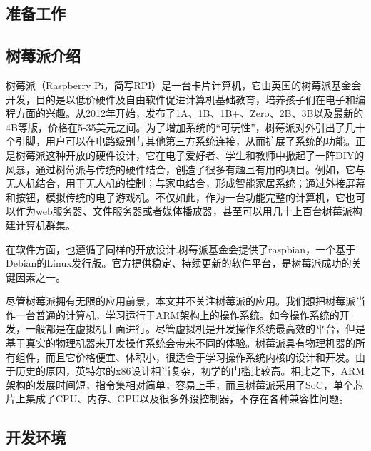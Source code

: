\documentclass[main.tex]{subfiles}
\begin{document}
\ifxetex\else
\begin{CJK*}{UTF8}{song}
\fi

\chapter{准备工作}
\section{树莓派介绍}

\par
树莓派（Raspberry Pi，简写RPI）是一台卡片计算机，它由英国的树莓派基金会开发，目的是以低价硬件及自由软件促进计算机基础教育，培养孩子们在电子和编程方面的兴趣。从2012年开始，发布了1A、1B、1B+、Zero、2B、3B以及最新的4B等版，价格在5-35美元之间。为了增加系统的“可玩性”，树莓派对外引出了几十个引脚，用户可以在电路级别与其他第三方系统连接，从而扩展了系统的功能。正是树莓派这种开放的硬件设计，它在电子爱好者、学生和教师中掀起了一阵DIY的风暴，通过树莓派与传统的硬件结合，创造了很多有趣且有用的项目。例如，它与无人机结合，用于无人机的控制；与家电结合，形成智能家居系统；通过外接屏幕和按钮，模拟传统的电子游戏机。不仅如此，作为一台功能完整的计算机，它也可以作为web服务器、文件服务器或者媒体播放器，甚至可以用几十上百台树莓派构建计算机群集。

\par
在软件方面，也遵循了同样的开放设计.树莓派基金会提供了raspbian，一个基于Debian的Linux发行版。官方提供稳定、持续更新的软件平台，是树莓派成功的关键因素之一。

\par
尽管树莓派拥有无限的应用前景，本文并不关注树莓派的应用。我们想把树莓派当作一台普通的计算机，学习运行于ARM架构上的操作系统。如今操作系统的开发，一般都是在虚拟机上面进行。尽管虚拟机是开发操作系统最高效的平台，但是基于真实的物理机器来开发操作系统会带来不同的体验。树莓派具有物理机器的所有组件，而且它价格便宜、体积小，很适合于学习操作系统内核的设计和开发。由于历史的原因，英特尔的x86设计相当复杂，初学的门槛比较高。相比之下，ARM架构的发展时间短，指令集相对简单，容易上手，而且树莓派采用了SoC，单个芯片上集成了CPU、内存、GPU以及很多外设控制器，不存在各种兼容性问题。

\section{开发环境}


\end{CJK*}
\end{document}
